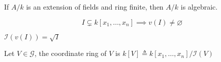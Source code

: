 \begin{lemma}
  If $A/k$ is an extension of fields and ring finite, then $A/k$ is algebraic.
\end{lemma}

\begin{theorem}
  \[ I \subsetneq k[x_1, \dots, x_n] \implies v(I) \neq \varnothing \]
\end{theorem}

\begin{theorem}
  $\mathcal{I}(v(I)) = \sqrt{I}$
\end{theorem}

\begin{definition}
  Let $V \in \mathcal{G}$, the coordinate ring of $V$ is $k[V] \triangleq k[x_1, \dots, x_n] / \mathcal{I}(V)$
\end{definition}
